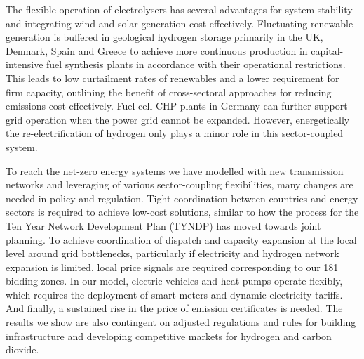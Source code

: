The flexible operation of electrolysers has several advantages for system
stability and integrating wind and solar generation cost-effectively.
Fluctuating renewable generation is buffered in geological hydrogen storage
primarily in the UK, Denmark, Spain and Greece to achieve more continuous
production in capital-intensive fuel synthesis plants in accordance with their
operational restrictions. This leads to low curtailment rates of renewables and
a lower requirement for firm capacity, outlining the benefit of cross-sectoral
approaches for reducing \co emissions cost-effectively. Fuel cell CHP plants in
Germany can further support grid operation when the power grid cannot be
expanded. However, energetically the re-electrification of hydrogen only plays a
minor role in this sector-coupled system.

To reach the net-zero energy systems we have modelled with new transmission
networks and leveraging of various sector-coupling flexibilities, many changes
are needed in policy and regulation. Tight coordination between countries and
energy sectors is required to achieve low-cost solutions, similar to how the
process for the Ten Year Network Development Plan (TYNDP) has moved towards
joint planning.\cite{entso-eTYNDP20222022} To achieve coordination of dispatch
and capacity expansion at the local level around grid bottlenecks, particularly
if electricity and hydrogen network expansion is limited, local price signals
are required corresponding to our 181 bidding zones. In our model, electric
vehicles and heat pumps operate flexibly, which requires the deployment of smart
meters and dynamic electricity tariffs. And finally, a sustained rise in the
price of \co emission certificates is needed. The results we show are also
contingent on adjusted regulations and rules for building infrastructure and
developing competitive markets for hydrogen and carbon dioxide.
